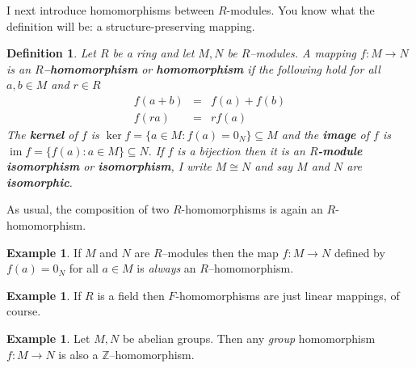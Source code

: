 \documentclass[11pt]{amsbook}
\DeclareMathOperator{\im}{\mathrm{im}}
\newtheorem{definition}[theorem]{Definition}
\theoremstyle{definition}
\newtheorem{ex}[theorem]{Example}
\begin{document}
 I next introduce homomorphisms between $R$-modules. You know what the definition will be: a structure-preserving mapping.

\begin{definition} Let $R$ be a ring and let $M,N$ be $R$--modules. A mapping $f:M \to N$ is
an {\bf $R$--homomorphism} or {\bf homomorphism} if the following hold for all $a,b\in M$ and $r\in R$
\begin{eqnarray*}
f(a+b) &=& f(a) + f(b)\\
f(ra) &=& rf(a)
\end{eqnarray*}
The {\bf kernel} of $f$ is $\ker f = \{ a\in M: f(a) = 0_N\}
\subseteq M$ and the {\bf image} of $f$ is $\im f = \{
f(a) : a\in M\} \subseteq N.$  If $f$ is a bijection then it is an {\bf $R$-module isomorphism} or {\bf isomorphism}, I write $M\cong N$ and say
$M$ and $N$ are {\bf isomorphic}.
\end{definition}
As usual, the composition of two $R$-homomorphisms is again an $R$-homomorphism.
\begin{ex}
 If $M$ and $N$ are $R$--modules then the map $f: M\to N$ defined by $f(a) = 0_N$
for all $a\in M$ is {\it always} an $R$--homomorphism.
\end{ex}

\begin{ex} If $R$ is a field then $F$-homomorphisms are just linear mappings, of course.
\end{ex}

\begin{ex}
Let
$M,N$ be abelian groups. Then any {\it group} homomorphism $f:
M\to N$ is also a $\mathbb{Z}$--homomorphism.
\end{ex}
\end{document}
